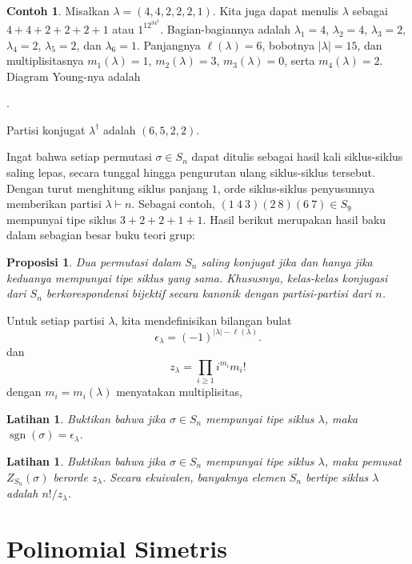 \documentclass[12pt]{article}
\theoremstyle{plain}
\newtheorem{proposition}[theorem]{Proposisi}
\newtheorem{exercise}[theorem]{Latihan}
\theoremstyle{definition}
\newtheorem{example}[theorem]{Contoh}
\theoremstyle{remark}
\numberwithin{equation}{section}
\begin{document}
\begin{example}
Misalkan $\lambda = (4,4,2,2,2,1)$.
Kita juga dapat menulis $\lambda$ sebagai $4+4+2+2+2+1$ atau $1^12^34^2$.
Bagian-bagiannya adalah $\lambda_1=4$, $\lambda_2=4$,
$\lambda_3=2$,
$\lambda_4=2$,
$\lambda_5=2$, dan
$\lambda_6=1$.
Panjangnya $\ell(\lambda)=6$, bobotnya $|\lambda|=15$,
dan multiplisitasnya $m_1(\lambda)=1$, $m_2(\lambda)=3$,
$m_3(\lambda)=0$, serta $m_4(\lambda)=2$.
Diagram Young-nya adalah
\begin{center}
.
\end{center}
Partisi konjugat $\lambda^\dag$ adalah $(6,5,2,2)$.
\end{example}

Ingat bahwa setiap permutasi $\sigma \in S_n$ dapat ditulis sebagai
hasil kali siklus-siklus saling lepas, secara tunggal hingga pengurutan ulang
siklus-siklus tersebut. Dengan turut menghitung siklus panjang $1$, orde
siklus-siklus penyusunnya memberikan partisi $\lambda \vdash n$.
Sebagai contoh, $(1\ 4\ 3)(2\ 8)(6\ 7) \in S_9$ mempunyai tipe siklus
$3+2+2+1+1$.
Hasil berikut merupakan hasil baku dalam sebagian besar buku teori grup:

\begin{proposition}
Dua permutasi dalam $S_n$ saling konjugat jika dan hanya jika keduanya mempunyai
tipe siklus yang sama.
Khususnya, kelas-kelas konjugasi dari $S_n$ berkorespondensi bijektif secara kanonik
dengan partisi-partisi dari $n$.
\end{proposition}

Untuk setiap partisi $\lambda$, kita mendefinisikan bilangan bulat
\[
\epsilon_\lambda = (-1)^{|\lambda|-\ell(\lambda)} .
\]
dan
\[
z_\lambda = \prod_{i \ge 1} i^{m_i} m_i!
\]
dengan $m_i=m_i(\lambda)$ menyatakan multiplisitas,

\begin{exercise}
Buktikan bahwa jika $\sigma \in S_n$ mempunyai tipe siklus $\lambda$,
maka $\operatorname{sgn}(\sigma)=\epsilon_\lambda$.
\end{exercise}

\begin{exercise}
Buktikan bahwa jika $\sigma \in S_n$ mempunyai tipe siklus $\lambda$,
maka pemusat $Z_{S_n}(\sigma)$ berorde $z_\lambda$.
Secara ekuivalen, banyaknya elemen $S_n$ bertipe siklus $\lambda$
adalah $n!/z_\lambda$.
\end{exercise}

\section{Polinomial Simetris}
\end{document}
